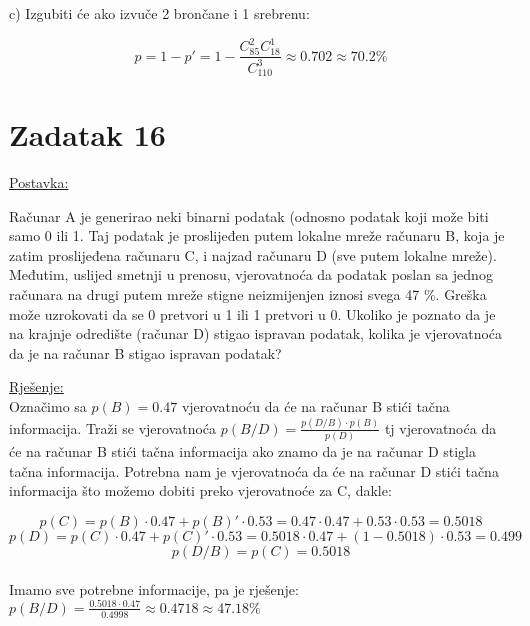 \documentclass[12pt]{article}
\begin{document}
c)
Izgubiti će ako izvuče 2 brončane i 1 srebrenu:

$$p = 1 - p' = 1 - \frac{C_{85}^2 C_{18}^1}{C_{110}^{3}} \approx 0.702 \approx 70.2\%$$

\newpage
\section*{Zadatak 16\label{Z16}}	 

\underline{Postavka:}
	
Računar A je generirao neki binarni podatak (odnosno podatak koji može biti samo 0 ili 1. Taj podatak je proslijeđen putem lokalne mreže računaru B, koja je zatim proslijeđena računaru C, i najzad računaru D (sve putem lokalne mreže). Međutim, uslijed smetnji u prenosu, vjerovatnoća da podatak poslan sa jednog računara na drugi putem mreže stigne neizmijenjen iznosi svega 47 \%. Greška može uzrokovati da se 0 pretvori u 1 ili 1 pretvori u 0. Ukoliko je poznato da je na krajnje odredište (računar D) stigao ispravan podatak, kolika je vjerovatnoća da je na računar B stigao ispravan podatak?

\underline{Rješenje:}\\

Označimo sa $p(B) = 0.47$ vjerovatnoću da će na računar B stići tačna informacija. Traži se vjerovatnoća $p(B/D) = \frac{p(D/B) \cdot p(B)}{p(D)}$ tj vjerovatnoća da će na računar B stići tačna informacija ako znamo da je na računar D stigla tačna informacija. Potrebna nam je vjerovatnoća da će na računar D stići tačna informacija što možemo dobiti preko vjerovatnoće za C, dakle:

$$p(C) = p(B) \cdot 0.47 + p(B)' \cdot 0.53 = 0.47 \cdot 0.47 + 0.53 \cdot 0.53 = 0.5018$$
$$p(D) = p(C) \cdot 0.47 + p(C)' \cdot 0.53 = 0.5018 \cdot 0.47 + (1 - 0.5018) \cdot 0.53 = 0.499$$
$$p(D/B) = p(C) = 0.5018$$\\

Imamo sve potrebne informacije, pa je rješenje: $p(B/D) = \frac{0.5018 \cdot 0.47}{0.4998} \approx 0.4718 \approx 47.18\%$
\end{document}
